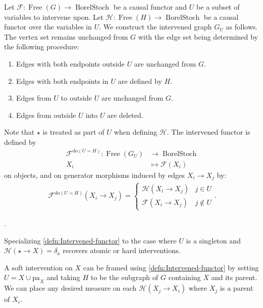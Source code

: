 \documentclass[../main.tex]{subfiles}
\begin{document}
    \begin{defn}
    \label{defn:Intervened-functor}
    Let ${\mathcal{F}:\operatorname{Free}(G)\to \operatorname{BorelStoch}}$ be a causal functor and ${U}$ be a subset of variables to intervene upon. Let ${\mathcal{H}: \operatorname{Free}(H)\to\operatorname{BorelStoch}}$ be a causal functor over the variables in ${U}$. We construct the intervened graph ${G_U}$ as follows. The vertex set remains unchanged from ${G}$ with the edge set being determined by the following procedure: 
    \begin{enumerate}
        \item Edges with both endpoints outside ${U}$ are  unchanged from ${G}$.
        \item Edges with both endpoints in ${U}$ are defined by ${H}$.
        \item Edges from ${U}$ to outside ${U}$ are unchanged from ${G}$.
        \item Edges from outside ${U}$ into ${U}$ are deleted.
    \end{enumerate}
    Note that ${\star}$ is treated as part of ${U}$ when defining ${\mathcal{H}}$. The intervened functor is defined by
    \begin{align*}
        \mathcal{F}^{\text{do}(U=H)}: \operatorname{Free}(G_U)&\to \operatorname{BorelStoch}\\
        X_i &\mapsto \mathcal{F}(X_i)
    \end{align*}
    on objects, and on generator morphisms induced by edges ${X_i\to X_j}$ by:
    \begin{align*}
        \mathcal{F}^{\text{do}(U=H)}(X_i\to X_j) = \begin{cases}
            \mathcal{H}(X_i\to X_j) & j \in U \\
            \mathcal{F}(X_i\to X_j) & j \notin U
        \end{cases}.
    \end{align*}
    \end{defn}
    . 
    \begin{rem}
    \label{rem:Atomic-and-stochastic-interventions}
        Specializing \autoref{defn:Intervened-functor} to the case where ${U}$ is a singleton and $\mathcal{H}(\star\to X) = \delta_a$ recovers atomic or hard interventions. 

        A soft intervention on ${X}$ can be framed using \autoref{defn:Intervened-functor} by setting ${U = X\cup \text{pa}_X}$ and taking ${H}$ to be the subgraph of ${G}$ containing ${X}$ and its parent. We can place any desired measure on each ${\mathcal{H}(X_j\to X_i)}$ where ${X_j}$ is a parent of ${X_i}$. 
    \end{rem}
\end{document}

